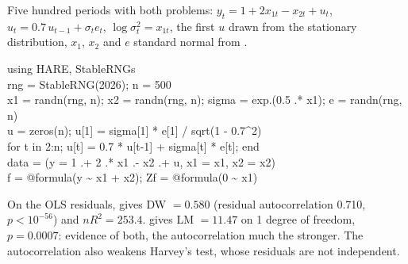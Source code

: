 Five hundred periods with both problems: $y_t = 1 + 2x_{1t} - x_{2t} + u_t$, $u_t = 0.7\,u_{t-1} + \sigma_t e_t$,
$\log\sigma_t^2 = x_{1t}$, the first $u$ drawn from the stationary distribution, $x_1$, $x_2$ and $e$ standard normal
from .
\begin{nbox}{}
\ttfamily\small
using HARE, StableRNGs\\
rng = StableRNG(2026); n = 500\\
x1 = randn(rng, n); x2 = randn(rng, n); sigma = exp.(0.5 .* x1); e = randn(rng, n)\\
u = zeros(n); u[1] = sigma[1] * e[1] / sqrt(1 - 0.7\^{}2)\\
for t in 2:n; u[t] = 0.7 * u[t-1] + sigma[t] * e[t]; end\\
data = (y = 1 .+ 2 .* x1 .- x2 .+ u, x1 = x1, x2 = x2)\\
f = @formula(y \textasciitilde{} x1 + x2); Zf = @formula(0 \textasciitilde{} x1)
\end{nbox}

On the OLS residuals,  gives DW $= 0.580$ (residual autocorrelation 0.710,
$p < 10^{-56}$) and  $nR^2 = 253.4$.  gives
LM $= 11.47$ on 1 degree of freedom, $p = 0.0007$: evidence of both, the autocorrelation much the stronger. The
autocorrelation also weakens Harvey's test, whose residuals are not independent.

